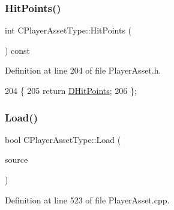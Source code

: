 \subsubsection{\texorpdfstring{Hit\+Points()}{HitPoints()}}
{\footnotesize\ttfamily int C\+Player\+Asset\+Type\+::\+Hit\+Points (\begin{DoxyParamCaption}{ }\end{DoxyParamCaption}) const\hspace{0.3cm}{\ttfamily [inline]}}



Definition at line 204 of file Player\+Asset.\+h.


\begin{DoxyCode}
204                              \{
205             \textcolor{keywordflow}{return} \hyperlink{classCPlayerAssetType_a0f10bff263838914bf347d9e9bf0af68}{DHitPoints};
206         \};
\end{DoxyCode}
\hypertarget{classCPlayerAssetType_a8e50738b1b451f4c870108777e6e3f90}{}\label{classCPlayerAssetType_a8e50738b1b451f4c870108777e6e3f90} 
\subsubsection{\texorpdfstring{Load()}{Load()}}
{\footnotesize\ttfamily bool C\+Player\+Asset\+Type\+::\+Load (\begin{DoxyParamCaption}\item[{std\+::shared\+\_\+ptr$<$ \hyperlink{classCDataSource}{C\+Data\+Source} $>$}]{source }\end{DoxyParamCaption})\hspace{0.3cm}{\ttfamily [static]}}



Definition at line 523 of file Player\+Asset.\+cpp.


